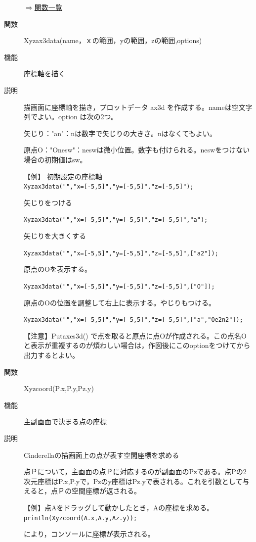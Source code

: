 \documentclass[papersize,a4paper,12pt,uplatex]{jsarticle}
\begin{document}
\begin{description}
\begin{flushright} \hyperlink{functionlist}{$\Rightarrow$関数一覧}\end{flushright}
\vspace{\baselineskip}
\hypertarget{xyzax3data}{}
\item[関数]  Xyzax3data(name，ｘの範囲，yの範囲，zの範囲,options)
\item[機能]  座標軸を描く
\item[説明]  描画面に座標軸を描き，プロットデータ ax3d  を作成する。nameは空文字列でよい。option は次の2つ。

矢じり："an"：nは数字で矢じりの大きさ。nはなくてもよい。

原点O："Onesw"：neswは微小位置。数字も付けられる。neswをつけない場合の初期値はsw。

【例】 初期設定の座標軸\\
\verb|Xyzax3data("","x=[-5,5]","y=[-5,5]","z=[-5,5]");|
        
 矢じりをつける
 
 \verb|Xyzax3data("","x=[-5,5]","y=[-5,5]","z=[-5,5]","a");|
 
 矢じりを大きくする
 
 \verb|Xyzax3data("","x=[-5,5]","y=[-5,5]","z=[-5,5]",["a2"]);|
  
原点のOを表示する。

 \verb|Xyzax3data("","x=[-5,5]","y=[-5,5]","z=[-5,5]",["O"]);|
 
 原点のOの位置を調整して右上に表示する。やじりもつける。
 
 \verb|Xyzax3data("","x=[-5,5]","y=[-5,5]","z=[-5,5]",["a","Oe2n2"]);|
 

【注意】Putaxes3d() で点を取ると原点に点Oが作成される。この点名Oと表示が重複するのが煩わしい場合は，作図後にこのoptionをつけてから出力するとよい。


\vspace{\baselineskip}
\hypertarget{xyzcoord}{}
\item[関数]  Xyzcoord(P.x,P.y,Pz.y)
\item[機能]  主副画面で決まる点の座標
\item[説明]  Cinderellaの描画面上の点が表す空間座標を求める

  点Ｐについて，主画面の点Ｐに対応するのが副画面のPzである。点Pの2次元座標はP.x,P.yで，Pzのy座標はPz.yで表される。これを引数として与えると，点Ｐの空間座標が返される。
  
\vspace{\baselineskip}
【例】点Aをドラッグして動かしたとき，Aの座標を求める。
\verb|println(Xyzcoord(A.x,A.y,Az.y));|
  
により，コンソールに座標が表示される。

\end{description}
\newpage
\end{document}
